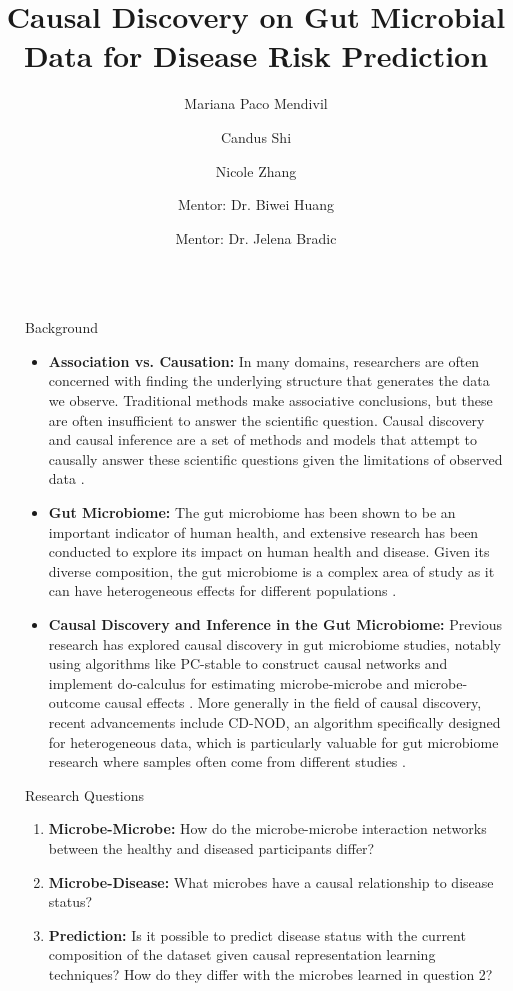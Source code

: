 \documentclass[final]{beamer}
\title{\centering Causal Discovery on Gut Microbial Data for Disease Risk Prediction}
\author{Mariana Paco Mendivil \inst{1} \and Candus Shi \inst{2} \and Nicole Zhang \inst{3} \and Mentor: Dr. Biwei Huang \inst{4} \and Mentor: Dr. Jelena Bradic \inst{5}}
\institute[shortinst]{\inst{1} mpacomendivil@ucsd.edu \samelineand \inst{2} c6shi@ucsd.edu \samelineand \inst{3} nwzhang@ucsd.edu \samelineand \inst{4} bih007@ucsd.edu \samelineand \inst{5} jbradic@ucsd.edu}
\newlength{\sepwidth}
\newlength{\colwidth}
\newcommand{\separatorcolumn}{\begin{column}{\sepwidth}\end{column}}
\begin{document}
\begin{frame}[t]
\begin{columns}[t]
\separatorcolumn

\begin{column}{\colwidth}

  \begin{block}{Background}
    \begin{itemize}
      \item \textbf{Association vs. Causation:} In many domains, researchers are often concerned with finding the underlying structure that generates the data we observe. Traditional methods make associative conclusions, but these are often insufficient to answer the scientific question. Causal discovery and causal inference are a set of methods and models that attempt to causally answer these scientific questions given the limitations of observed data \cite{pearl2016primer}.
      \item \textbf{Gut Microbiome:} The gut microbiome has been shown to be an important indicator of human health, and extensive research has been conducted to explore its impact on human health and disease. Given its diverse composition, the gut microbiome is a complex area of study as it can have heterogeneous effects for different populations \cite{baars2024gutt2d}. 
      \item \textbf{Causal Discovery and Inference in the Gut Microbiome:} Previous research has explored causal discovery in gut microbiome studies, notably using algorithms like PC-stable to construct causal networks and implement do-calculus for estimating microbe-microbe and microbe-outcome causal effects \cite{sazal2021causalgut}. More generally in the field of causal discovery, recent advancements include CD-NOD, an algorithm specifically designed for heterogeneous data, which is particularly valuable for gut microbiome research where samples often come from different studies \cite{huang2019cdnod}. 
    \end{itemize}

  \end{block}

  \begin{block}{Research Questions}

    \begin{enumerate}
      \item \textbf{Microbe-Microbe:} How do the microbe-microbe interaction networks between the healthy and diseased participants differ?
      \item \textbf{Microbe-Disease:} What microbes have a causal relationship to disease status?
      \item \textbf{Prediction:} Is it possible to predict disease status with the current composition of the dataset given causal representation learning techniques? How do they differ with the microbes learned in question 2?
    \end{enumerate}
  \end{block}


\end{column}
\end{columns}
\end{frame}
\end{document}
